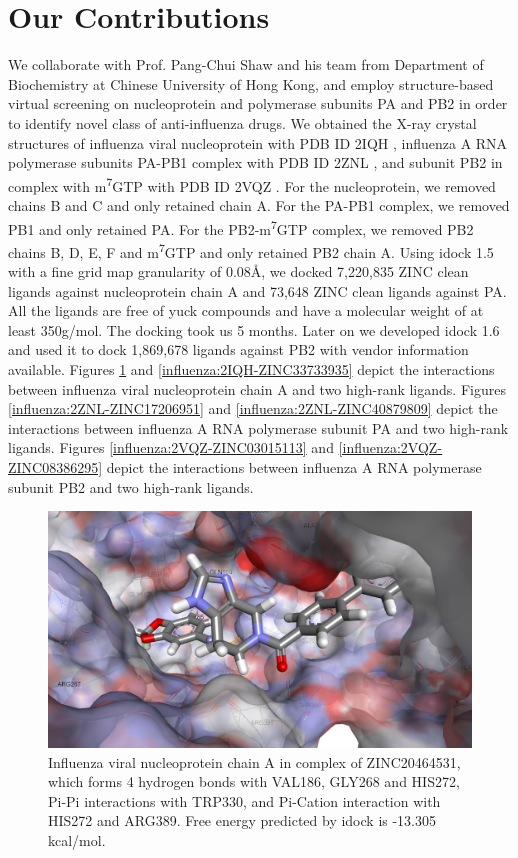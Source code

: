\section{Our Contributions}

We collaborate with Prof. Pang-Chui Shaw and his team from Department of Biochemistry at Chinese University of Hong Kong, and employ structure-based virtual screening on nucleoprotein and polymerase subunits PA and PB2 in order to identify novel class of anti-influenza drugs. We obtained the X-ray crystal structures of influenza viral nucleoprotein with PDB ID 2IQH \citep{1140}, influenza A RNA polymerase subunits PA-PB1 complex with PDB ID 2ZNL \citep{1141}, and subunit PB2 in complex with m\textsuperscript{7}GTP with PDB ID 2VQZ \citep{1192}. For the nucleoprotein, we removed chains B and C and only retained chain A. For the PA-PB1 complex, we removed PB1 and only retained PA. For the PB2-m\textsuperscript{7}GTP complex, we removed PB2 chains B, D, E, F and m\textsuperscript{7}GTP and only retained PB2 chain A. Using idock 1.5 with a fine grid map granularity of 0.08\AA, we docked 7,220,835 ZINC \citep{532} clean ligands against nucleoprotein chain A and 73,648 ZINC clean ligands against PA. All the ligands are free of yuck compounds and have a molecular weight of at least 350g/mol. The docking took us 5 months. Later on we developed idock 1.6 and used it to dock 1,869,678 ligands against PB2 with vendor information available. Figures \ref{influenza:2IQH-ZINC20464531} and \ref{influenza:2IQH-ZINC33733935} depict the interactions between influenza viral nucleoprotein chain A and two high-rank ligands. Figures \ref{influenza:2ZNL-ZINC17206951} and \ref{influenza:2ZNL-ZINC40879809} depict the interactions between influenza A RNA polymerase subunit PA and two high-rank ligands. Figures \ref{influenza:2VQZ-ZINC03015113} and \ref{influenza:2VQZ-ZINC08386295} depict the interactions between influenza A RNA polymerase subunit PB2 and two high-rank ligands.

\begin{figure}
\centering
\includegraphics[width=\linewidth]{../influenza/2IQH-ZINC20464531.png}
\caption{Influenza viral nucleoprotein chain A in complex of ZINC20464531, which forms 4 hydrogen bonds with VAL186, GLY268 and HIS272, Pi-Pi interactions with TRP330, and Pi-Cation interaction with HIS272 and ARG389. Free energy predicted by idock is -13.305 kcal/mol.}
\label{influenza:2IQH-ZINC20464531}
\end{figure}

